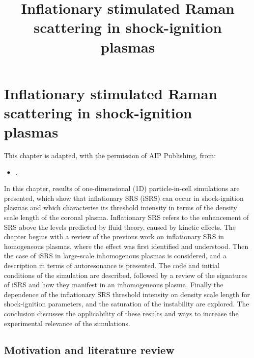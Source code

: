 
\chapter{Inflationary stimulated Raman scattering in shock-ignition plasmas}
\label{chp:iSRS}
%

\title{Inflationary stimulated Raman scattering in shock-ignition plasmas}

This chapter is adapted, with the permission of AIP Publishing, from:
\begin{itemize}
  \item {}.
\end{itemize}

In this chapter, results of one-dimensional (1D) particle-in-cell simulations are presented, which show that inflationary SRS (iSRS) can occur in shock-ignition plasmas and which characterise its threshold intensity in terms of the density scale length of the coronal plasma. Inflationary SRS refers to the enhancement of SRS above the levels predicted by fluid theory, caused by kinetic effects. The chapter begins with a review of the previous work on inflationary SRS in homogeneous plasmas, where the effect was first identified and understood. Then the case of iSRS in large-scale inhomogenous plasmas is considered, and a description in terms of autoresonance is presented. The code and initial conditions of the simulation are described, followed by a review of the signatures of iSRS and how they manifest in an inhomogeneous plasma. Finally the dependence of the inflationary SRS threshold intensity on density scale length for shock-ignition parameters, and the saturation of the instability are explored. The conclusion discusses the applicability of these results and ways to increase the experimental relevance of the simulations.


\section{Motivation and literature review}


